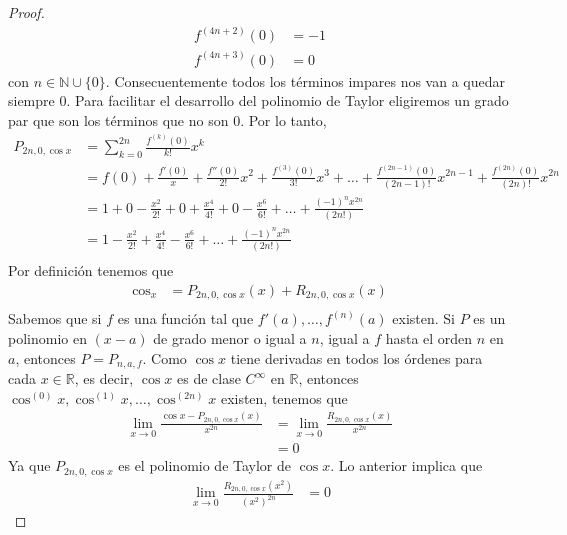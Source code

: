 \documentclass[a4paper]{article}
\begin{document}
\begin{proof}
\begin{align*}
        f^{(4n + 2)}(0) &= -1 \\
        f^{(4n + 3)}(0) &= 0
    \end{align*}
    con \(n \in \mathbb{N} \cup \{0\}\).
    \newline
    Consecuentemente todos los términos impares nos van a quedar siempre \(0\). Para 
    facilitar el desarrollo del polinomio de Taylor eligiremos un grado par que son 
    los términos que no son \(0\). Por lo tanto,
    \begin{align*}
        P_{2n, 0, \cos{x}} &= \sum_{k=0}^{2n} \frac{f^{(k)}(0)}{k!}x^{k} \\
        &= f(0) + \frac{f'(0)}x + \frac{f''(0)}{2!}x^{2} + \frac{f^{(3)}(0)}{3!}x^{3} + \dotsc + \frac{f^{(2n - 1)}(0)}{(2n - 1)!}x^{2n - 1} +\frac{f^{(2n)}(0)}{(2n)!}x^{2n} \\
        &= 1 + 0 - \frac{x^2}{2!} + 0 + \frac{x^4}{4!} + 0 - \frac{x^6}{6!} + \dotsc + \frac{(-1)^{n}x^{2n}}{(2n!)} \\
        &= 1 - \frac{x^2}{2!} + \frac{x^4}{4!} - \frac{x^6}{6!} + \dotsc + \frac{(-1)^{n}x^{2n}}{(2n!)} \\
    \end{align*}
    Por definición tenemos que 
    \begin{align*}
        \cos_{x} &= P_{2n, 0, \cos{x}}(x) + R_{2n, 0, \cos{x}}(x) \\
    \end{align*}
    Sabemos que si \(f\) es una función tal que \(f'(a), \dotsc, f^{(n)}(a)\) existen. Si 
    \(P\) es un polinomio en \((x-a)\) de grado menor o igual a \(n\), igual a \(f\) 
    hasta el orden \(n\) en \(a\), entonces \(P = P_{n, a, f}\).
    Como \(\cos{x}\) tiene derivadas en todos los órdenes para cada 
    \(x \in \mathbb{R}\), es decir, \(\cos{x}\) es de clase \(C^{\infty}\) en \(\mathbb{R}\), 
    entonces \(\cos^{(0)}{x}, \cos^{(1)}{x}, \dotsc, \cos^{(2n)}{x}\) existen, tenemos que 
    \begin{align*}
        \lim_{x \to 0} \frac{\cos{x} - P_{2n, 0, \cos{x}}(x)}{x^{2n}} &= \lim_{x \to 0} \frac{R_{2n, 0, \cos{x}}(x)}{x^{2n}}\\
        &= 0
    \end{align*}
    Ya que \(P_{2n, 0, \cos{x}}\) es el polinomio de Taylor de \(\cos{x}\).
    \newline
    Lo anterior implica que
    \begin{align*}
        \lim_{x \to 0} \frac{R_{2n, 0, \cos{x}}(x^2)}{(x^2)^{2n}} &= 0
    \end{align*}

\end{proof}
\end{document}
